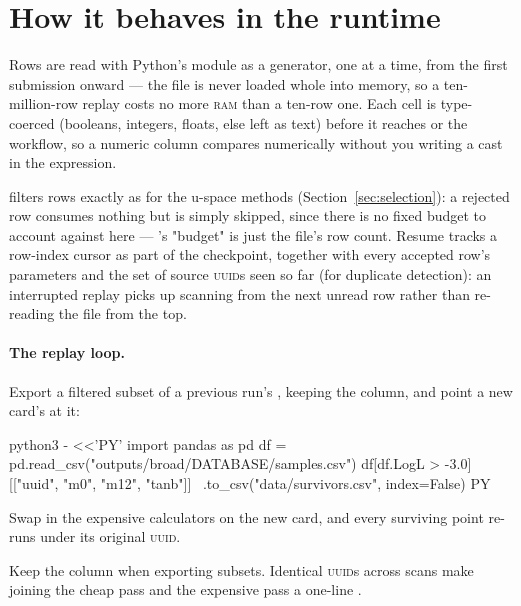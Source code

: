 \section{How it behaves in the runtime}
\label{sec:csv-runtime}

Rows are read with Python's  module as a generator, one at a time, from the
first submission onward --- the file is never loaded whole into memory, so a
ten-million-row replay costs no more \textsc{ram} than a ten-row one. Each cell is
type-coerced (booleans, integers, floats, else left as text) before it reaches
 or the workflow, so a numeric column compares numerically without
you writing a cast in the expression.

 filters rows exactly as for the u-space methods
(Section~\ref{sec:selection}): a rejected row consumes nothing but is simply skipped,
since there is no fixed budget to account against here --- 's "budget" is
just the file's row count. Resume tracks a row-index cursor as part of the checkpoint,
together with every accepted row's parameters and the set of source \textsc{uuid}s seen
so far (for duplicate detection): an interrupted replay picks up scanning from the next
unread row rather than re-reading the file from the top.

\paragraph{The replay loop.} Export a filtered subset of a previous run's
, keeping the  column, and point a new card's
 at it:

\begin{terminal}
\begin{jcmd}
python3 - <<'PY'
import pandas as pd
df = pd.read_csv("outputs/broad/DATABASE/samples.csv")
df[df.LogL > -3.0][["uuid", "m0", "m12", "tanb"]] \
  .to_csv("data/survivors.csv", index=False)
PY
\end{jcmd}
\end{terminal}

Swap in the expensive calculators on the new card, and every surviving point re-runs
under its original \textsc{uuid}.

\begin{jtip}
Keep the  column when exporting subsets. Identical \textsc{uuid}s across
scans make joining the cheap pass and the expensive pass a one-line \code{merge}.
\end{jtip}

